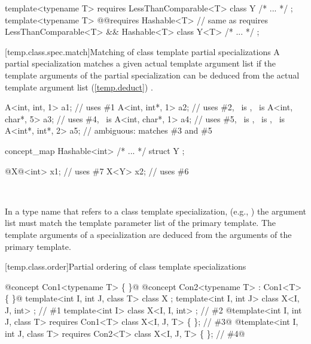 \documentclass[american]{book}
\begin{document}
\begin{paras}
\begin{codeblock}
template<typename T> requires LessThanComparable<T> class Y { /* ... */ };
template<typename T> 
  @\textcolor{addclr}{}@requires Hashable<T> // same as requires LessThanComparable<T> \&\& Hashable<T>
  class Y<T> { /* ... */ }; 
\end{codeblock}
\color{black}
\addedConcepts{\mbox{\exitexample}}

[temp.class.spec.match]{Matching of class template partial specializations}
\setcounter{Paras}{1}
\pnum
A partial specialization matches a given actual template argument
list if the template arguments of the partial specialization can be
deduced from the actual template argument list (\ref{temp.deduct})
.
\enterexample\ 

\begin{codeblock}
A<int, int, 1>   a1;            // uses \#1
A<int, int*, 1>  a2;            // uses \#2, \ is , \ is 
A<int, char*, 5> a3;            // uses \#4, \ is 
A<int, char*, 1> a4;            // uses \#5, \ is , \ is , \ is 
A<int*, int*, 2> a5;            // ambiguous: matches \#3 and \#5
\end{codeblock}
\color{addclr}
\begin{codeblock}
concept_map Hashable<int> { /* ... */ }
struct Y { };

@\textcolor{addclr}{X}@<int> x1;                     // uses \#7
X<Y> x2;                       // uses \#6
\end{codeblock}
\color{black}
\exitexample\ 

\setcounter{Paras}{3}
\pnum
In a type name that refers to a class template specialization, (e.g.,
)
the argument list must match the template parameter list of the primary
template. 
The template arguments of a specialization are deduced from the arguments
of the primary template.

[temp.class.order]{Partial ordering of class template specializations}
\setcounter{Paras}{1}
\pnum
\enterexample\ 
\begin{codeblock}
@\textcolor{addclr}{concept Con1<typename T> \{ \}}@
@\textcolor{addclr}{concept Con2<typename T> : Con1<T> \{ \}}@
template<int I, int J, class T> class X { };
template<int I, int J>          class X<I, J, int> { }; // \#1
template<int I>                 class X<I, I, int> { }; // \#2
@\textcolor{addclr}{template<int I, int J, class T> requires Con1<T> class X<I, J, T> \{ \}; // \#3}@
@\textcolor{addclr}{template<int I, int J, class T> requires Con2<T> class X<I, J, T> \{ \}; // \#4}@


\end{codeblock}
\end{paras}
\end{document}
